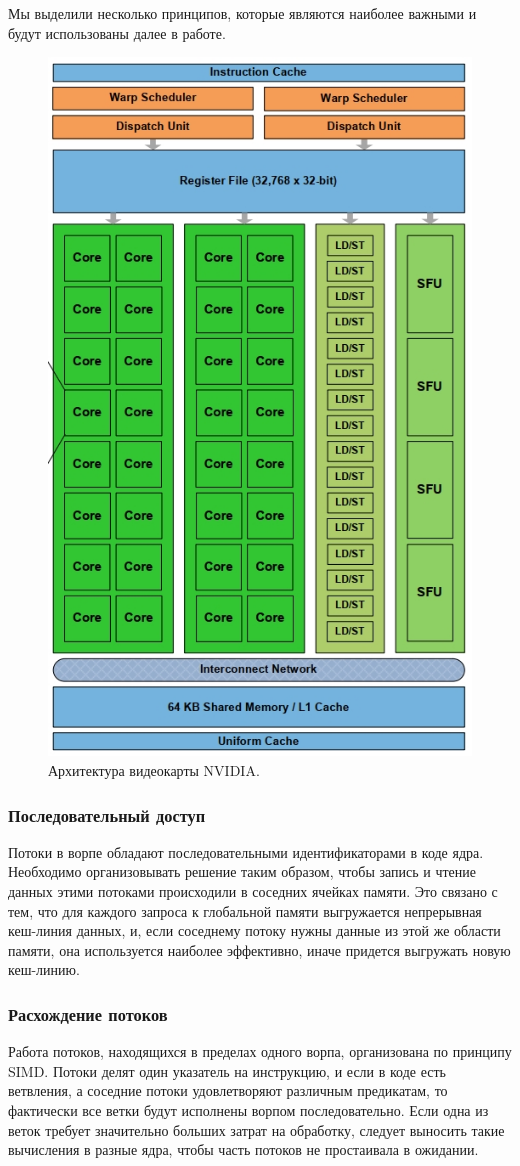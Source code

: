 \documentclass[14pt]{extarticle}
\begin{document}
	
	Мы выделили несколько принципов, которые являются наиболее важными и будут использованы далее в работе.
	

	
\begin{figure}
	\centering
	\includegraphics[width=0.4\linewidth]{picts/sm_nvidia}
	\caption{Архитектура видеокарты NVIDIA.}
	\label{fig:smnvidia}
\end{figure}
	\subsubsection*{Последовательный доступ}
	
	Потоки в ворпе обладают последовательными идентификаторами в коде ядра. Необходимо организовывать решение таким образом, чтобы запись и чтение данных этими потоками происходили в соседних ячейках памяти. Это связано с тем, что для каждого запроса к глобальной памяти выгружается непрерывная кеш-линия данных, и, если соседнему потоку нужны данные из этой же области памяти, она используется наиболее эффективно, иначе придется выгружать новую кеш-линию.
	
	\subsubsection*{Расхождение потоков}
	
	Работа потоков, находящихся в пределах одного ворпа, организована по принципу SIMD. Потоки делят один указатель на инструкцию, и если в коде есть ветвления, а соседние потоки удовлетворяют различным предикатам, то фактически все ветки будут исполнены ворпом последовательно. Если одна из веток требует значительно больших затрат на обработку, следует выносить такие вычисления в разные ядра, чтобы часть потоков не простаивала в ожидании.
	
\end{document}
